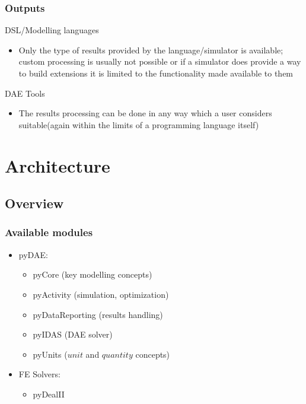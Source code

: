 \documentclass[compress,newPxFont,sthlmFooter]{beamer}
\begin{document}
\begin{frame}
\frametitle{Outputs}
\begin{block}{\textcolor{light_red}{DSL/Modelling languages}}
\begin{itemize}
  \item Only the type of results provided by the language/simulator is available; custom processing is usually not possible or
        if a simulator does provide a way to build extensions it is limited to the functionality made available to them 
\end{itemize}
\end{block}

\begin{block}{\textcolor{light_green}{DAE Tools}}
\begin{itemize}
  \item The results processing can be done in any way which a user considers suitable(again within the limits
        of a programming language itself) 
\end{itemize}
\end{block}
\end{frame}

\section{Architecture}

\subsection{Overview}
\begin{frame}
\frametitle{Available modules}
\begin{block}{}
\begin{itemize}
  \item pyDAE:
  \begin{itemize}
    \item pyCore (key modelling concepts)
    \item pyActivity (simulation, optimization)
    \item pyDataReporting (results handling)
    \item pyIDAS (DAE solver)
    \item pyUnits ($unit$ and $quantity$ concepts)
  \end{itemize}
\end{itemize}
\end{block}
\begin{block}{}
\begin{itemize}
  \item FE Solvers: 
  \begin{itemize}
    \item pyDealII
  \end{itemize}
\end{itemize}
\end{block}
\end{frame}
\end{document}

